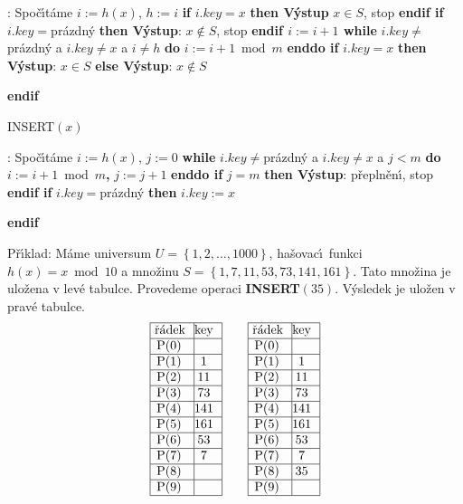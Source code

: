 :\newline 
Spo\v c\'\i t\'ame $i:=h\left(x\right)$, $h:=i$\newline 
{\bf if} $i.key=x$ {\bf then V\'ystup} $x\in S$, stop {\bf endif\newline 
if} $i.key=$pr\'azdn\'y {\bf then {{\rm V\'ystup}}}: $x\notin S$, stop {\bf endif\newline 
$i:=i+1$\newline 
while} $i.key\ne$pr\'azdn\'y a $i.key\ne x$ a $i\ne h$ {\bf do} $
i:=i+1\bmod m$ {\bf enddo\newline 
if} $i.key=x$ {\bf then V\'ystup}: $x\in S$ {\bf else V\'ystup}: $
x\notin S$ {\bf endif
\medskip

\flushpar INSERT$\left(x\right)$}:\newline 
Spo\v c\'\i t\'ame $i:=h\left(x\right)$, $j:=0$\newline 
{\bf while} $i.key\ne$pr\'azdn\'y a $i.key\ne x$ a $j<m$ {\bf do} $
i:=i+1\bmod m${\bf ,} $j:=j+1$ {\bf enddo\newline 
if} $j=m$ {\bf then V\'ystup}: p\v repln\v en\'\i , stop {\bf endif\newline 
if} $i.key=$pr\'azdn\'y {\bf then} $i.key:=x$ {\bf endif
\bigskip

}\flushpar P\v r\'\i klad: M\'ame universum $U=\left\{1,2,\dots,1000\right\}$, 
ha\v sovac\'\i\ funk\-ci $h\left(x\right)=x\bmod10$ a mno\v zinu  
$S=\left\{1,7,11,53,73,141,161\right\}$. Tato mno\v zina je ulo\v zena v lev\'e tabulce. 
Provedeme operaci {\bf INSERT$\left(35\right)$}. V\'ysledek je ulo\v zen v 
prav\'e tabulce.
$$\vbox {\hbox{\vtop{\offinterlineskip\halign{\strut\vrule\ # & \vrule\hfil# \hfil\vrule\cr\noalign{\hrule}\v r\'adek & key \hfil\cr\noalign{\hrule}P(0) & \hfill \cr\noalign{\hrule}P(1) & 1 \cr\noalign{\hrule}P(2) & 11 \cr\noalign{\hrule}P(3) & 73 \cr\noalign{\hrule}P(4) & 141 \cr\noalign{\hrule}P(5) & 161 \cr\noalign{\hrule}P(6) & 53 \cr\noalign{\hrule}P(7) & 7 \cr\noalign{\hrule}P(8) & \hfill\cr\noalign{\hrule}P(9) & \hfill \cr\noalign{\hrule}}}\qquad\vtop{\offinterlineskip\halign {\strut\vrule\ # & \vrule \hfil # \hfil \vrule\cr\noalign{\hrule}\v r\'adek & key \hfil \cr\noalign{\hrule}P(0) & \hfill \cr\noalign{\hrule}P(1) & 1 \cr\noalign{\hrule}P(2) & 11 \cr\noalign{\hrule}P(3) & 73 \cr\noalign{\hrule}P(4) & 141 \cr\noalign{\hrule}P(5) & 161 \cr\noalign{\hrule}P(6) & 53 \cr\noalign{\hrule}P(7) & 7 \cr\noalign{\hrule}P(8) & 35  \cr\noalign{\hrule}P(9) & \hfill \cr\noalign{\hrule}}}}}$$

